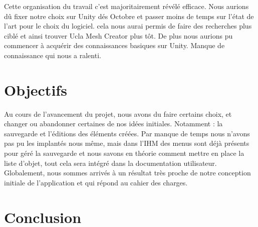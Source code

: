 \documentclass[a4paper,11pt]{article}
\begin{document}
				Cette organisation du travail c'est majoritairement révélé efficace. Nous aurions dû fixer notre choix sur Unity dés Octobre et passer moins de temps sur l'état de l'art pour le choix du logiciel. cela nous aurai permis de faire des recherches plus ciblé et ainsi trouver Ucla Mesh Creator plus tôt. De plus nous aurions pu commencer à acquérir des connaissances basiques sur Unity. Manque de connaissance qui nous a ralenti.
			
	
	\section{Objectifs}

		Au cours de l'avancement du projet, nous avons du faire certains choix, et changer ou abandonner certaines de nos idées initiales. Notamment : la sauvegarde et l'éditions des éléments créées.
		Par manque de temps nous n'avons pas pu les implantés nous même, mais dans l'IHM des menus sont déjà présents pour géré la sauvegarde et nous savons en théorie comment mettre en place la liste d'objet, tout cela sera intégré dans la documentation utilisateur.
		Globalement, nous sommes arrivés à un résultat très proche de notre conception initiale de l'application et qui répond au cahier des charges.
	
	\section{Conclusion}
			
\end{document}

